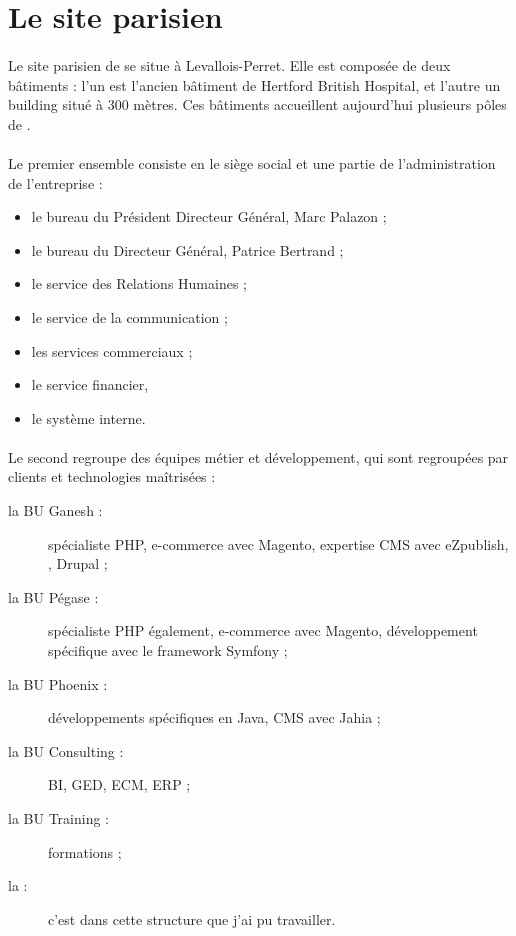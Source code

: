 \section{Le site parisien}

\paragraph{}
Le site parisien de \asmile{} se situe à Levallois-Perret.
Elle est composée de deux bâtiments : l'un est l'ancien bâtiment de Hertford British Hospital, et l'autre un building situé à 300 mètres.
Ces bâtiments accueillent aujourd'hui plusieurs pôles de \asmile{}.

\paragraph{}
Le premier ensemble consiste en le siège social et une partie de l'administration de l'entreprise :

\begin{itemize}
	\item le bureau du Président Directeur Général, Marc Palazon ;
	\item le bureau du Directeur Général, Patrice Bertrand ;
	\item le service des Relations Humaines ;
	\item le service de la communication ;
	\item les services commerciaux ;
	\item le service financier,
	\item le système interne.
\end{itemize}

\paragraph{}
Le second regroupe des équipes métier et développement, qui sont regroupées par clients et technologies maîtrisées :

\begin{description}
	\item[la BU Ganesh :] spécialiste PHP, e-commerce avec Magento, expertise CMS avec eZpublish, \atypo{}, Drupal ;
	\item[la BU Pégase :] spécialiste PHP également, e-commerce avec Magento, développement spécifique avec le framework Symfony ;
	\item[la BU Phoenix :] développements spécifiques en Java, CMS avec Jahia ;
	\item[la BU Consulting :] BI, GED, ECM, ERP ;
	\item[la BU Training :] formations ;
	\item[la \abusys{} :] c'est dans cette structure que j'ai pu travailler.
\end{description}


